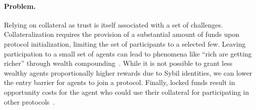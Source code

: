 \documentclass[runningheads]{llncs}
\newcommand{\aza}[1]{\todo[linecolor=blue,backgroundcolor=blue!25,bordercolor=blue,inline,caption={}]{Comment by Alexei: #1}}
\begin{document}
\paragraph{Problem.}
Relying on collateral as trust is itself associated with a set of challenges. 
Collateralization requires the provision of a substantial amount of funds upon protocol initialization, limiting the set of participants to a selected few.
Leaving participation to a small set of agents can lead to phenomena like ``rich are getting richer'' through wealth compounding~\cite{Fanti2019Compounding}.
While it is not possible to grant less wealthy agents proportionally higher rewards due to Sybil identities, we can lower the entry barrier for agents to join a protocol.
Finally, locked funds result in opportunity costs for the agent who could use their collateral for participating in other protocols~\cite{Harz2019Balance}.


\end{document}

